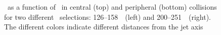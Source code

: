 \begin{figure}
   \caption{\RDptr\ as a function of \pt\ in central (top) and peripheral (bottom) collisions for two different \ptjet\ selections: 126--158~\GeV\ (left) and 200--251~\GeV\ (right). The different colors indicate different distances from the jet axis}
      \label{fig:RDpT_wrt_trk}
\end{figure}


